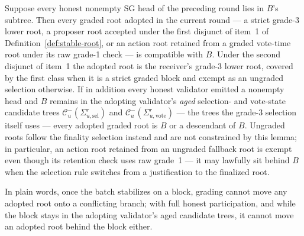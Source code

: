 \begin{lemma}
\label{lem:root-no-regression}
Suppose every honest nonempty SG head of the preceding round lies in
\(B\)'s subtree.  Then every graded root adopted in the current round ---
a strict grade-3 lower root, a proposer root accepted under the first
disjunct of item~1 of Definition~\ref{def:stable-root}, or an action
root retained from a graded vote-time root under its raw grade-1 check
--- is compatible with \(B\)\@.  Under the second disjunct of item~1
the adopted root is the receiver's grade-3 lower root, covered by the
first class when it is a strict graded block and exempt as an ungraded
selection otherwise.  If in
addition every honest validator emitted a nonempty head and \(B\)
remains in the adopting validator's \emph{aged} selection- and
vote-state candidate trees
\(\mathcal C^{-}_u(\Sigma_{u,\mathrm{sel}}^r)\) and
\(\mathcal C^{-}_u(\Sigma_{u,\mathrm{vote}}^r)\) --- the trees the
grade-3 selection itself uses --- every adopted
graded root is \(B\) or a descendant of \(B\).  Ungraded roots follow the finality
selection instead and are not constrained by this lemma; in particular,
an action root retained from an ungraded fallback root is exempt even
though its retention check uses raw grade~1 --- it may lawfully sit
behind \(B\) when the selection rule switches from a justification to
the finalized root.

In plain words, once the batch stabilizes on a block, grading cannot move
any adopted root onto a conflicting branch; with full honest
participation, and while the block stays in the adopting validator's
aged candidate trees, it cannot move an adopted root behind the block
either.
\end{lemma}

